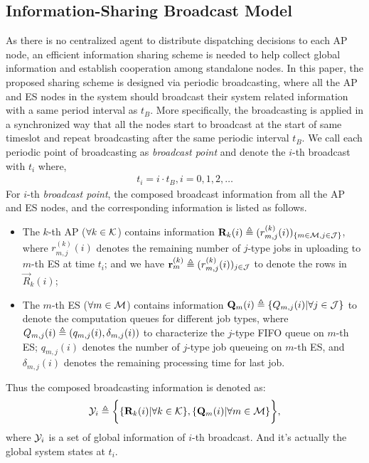 \subsection{Information-Sharing Broadcast Model}
As there is no centralized agent to distribute dispatching decisions to each AP node, an efficient information sharing scheme is needed to help collect global information and establish cooperation among standalone nodes.
In this paper, the proposed sharing scheme is designed via periodic broadcasting, where all the AP and ES nodes in the system should broadcast their system related information with a same period interval as $t_B$. More specifically, the broadcasting is applied in a synchronized way that all the nodes start to broadcast at the start of same timeslot and repeat broadcasting after the same periodic interval $t_B$. We call each periodic point of broadcasting as \emph{broadcast point} and denote the $i$-th broadcast with $t_i$ where,
\begin{align}
    t_i = i \cdot t_B, i=0,1,2,\dots
\end{align}
For $i$-th \emph{broadcast point}, the composed broadcast information from all the AP and ES nodes, and the corresponding information is listed as follows.
\begin{itemize}
    \item The $k$-th AP ($\forall k\in\mathcal{K}$) contains information $\mathbf{R}_k(i) \triangleq (r^{(k)}_{m,j}(i))_{\{m\in\mathcal{M},j\in\mathcal{J}\}}$, where $r^{(k)}_{m,j}(i)$ denotes the remaining number of $j$-type jobs in uploading to $m$-th ES at time $t_i$; and we have $\mathbf{r}^{(k)}_{m} \triangleq (r^{(k)}_{m,j}(i))_{j\in\mathcal{J}}$ to denote the rows in $\vec{R}_k(i)$;
    \item The $m$-th ES ($\forall m\in\mathcal{M}$) contains information $\mathbf{Q}_m(i) \triangleq \{Q_{m,j}(i)|\forall j\in\mathcal{J}\}$ to denote the computation queues for different job types, where $Q_{m,j}(i) \triangleq (q_{m,j}(i), \delta_{m,j}(i))$ to characterize the $j$-type FIFO queue on $m$-th ES; $q_{m,j}(i)$ denotes the number of $j$-type job queueing on $m$-th ES, and $\delta_{m,j}(i)$ denotes the remaining processing time for last job.
\end{itemize}
Thus the composed broadcasting information is denoted as:
\begin{align}
    \mathcal{Y}_i \triangleq
        \bigg\{
            \{\mathbf{R}_{k}(i)|\forall k\in\mathcal{K}\},
            \{\mathbf{Q}_m(i)|\forall m\in\mathcal{M}\}
        \bigg\},
\end{align}
where $\mathcal{Y}_i$ is a set of global information of $i$-th broadcast. And it's actually the global system states at $t_i$.

